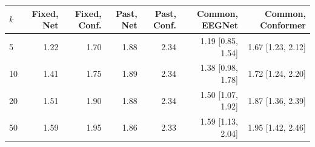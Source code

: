 \begin{tabular}{@{}lrrrrrr@{}}\toprule
$k$ & Fixed, Net & Fixed, Conf. & Past, Net & Past, Conf. & Common, EEGNet & Common, Conformer \\\midrule
5 & 1.22 & 1.70 & 1.88 & 2.34 & 1.19 [0.85, 1.54] & 1.67 [1.23, 2.12] \\
10 & 1.41 & 1.75 & 1.89 & 2.34 & 1.38 [0.98, 1.78] & 1.72 [1.24, 2.20] \\
20 & 1.51 & 1.90 & 1.88 & 2.34 & 1.50 [1.07, 1.92] & 1.87 [1.36, 2.39] \\
50 & 1.59 & 1.95 & 1.86 & 2.33 & 1.59 [1.13, 2.04] & 1.95 [1.42, 2.46] \\
\bottomrule\end{tabular}
